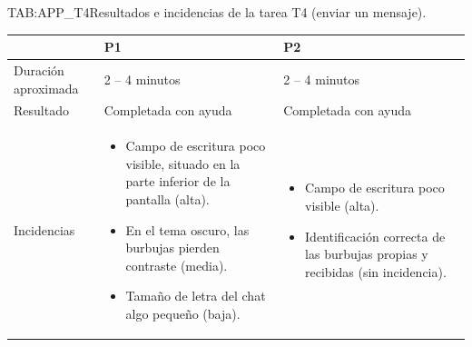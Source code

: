 \begin{table}[Incidencias T4]{TAB:APP_T4}{Resultados e
incidencias de la tarea T4 (enviar un mensaje).}
\begin{center}
\begin{tabular}{p{3.5cm}p{4.5cm}p{4.5cm}}
\toprule
& \textbf{P1} & \textbf{P2} \\
\midrule
Duración aproximada    & 2 -- 4 minutos & 2 -- 4 minutos \\
Resultado              & Completada con ayuda & Completada con ayuda \\
\midrule
Incidencias &
\begin{itemize}\setlength\itemsep{0pt}\setlength\parsep{0pt}
\item Campo de escritura poco visible, situado en la parte inferior de la pantalla (alta).
\item En el tema oscuro, las burbujas pierden contraste (media).
\item Tamaño de letra del chat algo pequeño (baja).
\end{itemize}
&
\begin{itemize}\setlength\itemsep{0pt}\setlength\parsep{0pt}
\item Campo de escritura poco visible (alta).
\item Identificación correcta de las burbujas propias y recibidas (sin incidencia).
\end{itemize}\\
\bottomrule
\end{tabular}
\end{center}
\end{table}
\FloatBarrier

